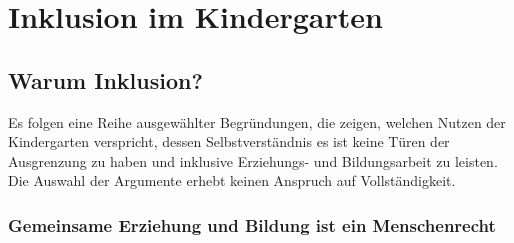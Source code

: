 \chapter{Inklusion im Kindergarten}

\section{Warum Inklusion?}
\label{sec:Why}
Es folgen eine Reihe ausgewählter Begründungen, die zeigen, welchen Nutzen der Kindergarten verspricht, dessen Selbstverständnis es ist keine Türen der Ausgrenzung zu haben und inklusive Erziehungs- und Bildungsarbeit zu leisten. Die Auswahl der Argumente erhebt keinen Anspruch auf Vollständigkeit.

\subsection{Gemeinsame Erziehung und Bildung ist ein Menschenrecht}
\label{sec:BRK}
